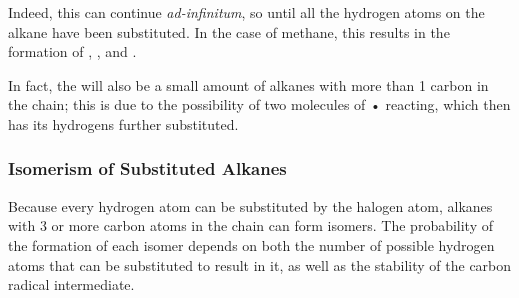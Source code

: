 
			Indeed, this can continue \textit{ad-infinitum}, so until all the hydrogen atoms on the alkane have been substituted.
			In the case of methane, this results in the formation of , ,  and
			.

			In fact, the will also be a small amount of alkanes with more than 1 carbon in the chain; this is due to the
			possibility of two molecules of • reacting, which then has its hydrogens further substituted.





		\pagebreak
		\subsubsection{Isomerism of Substituted Alkanes}

			Because every hydrogen atom can be substituted by the halogen atom, alkanes with 3 or more carbon atoms in the chain
			can form isomers. The probability of the formation of each isomer depends on both the number of possible hydrogen atoms
			that can be substituted to result in it, as well as the stability of the carbon radical intermediate.


